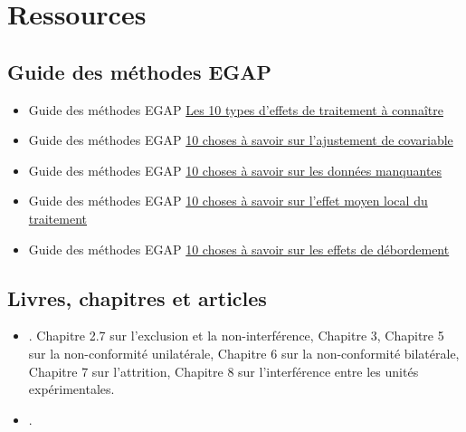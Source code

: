 \documentclass[
  12pt,
]{book}
\begin{document}
\hypertarget{ressources-4}{%
\section{Ressources}\label{ressources-4}}

\hypertarget{guide-des-muxe9thodes-egap-4}{%
\subsection{Guide des méthodes EGAP}\label{guide-des-muxe9thodes-egap-4}}

\begin{itemize}
\item
  Guide des méthodes EGAP \href{https://egap.org/resource/10-types-of-treatment-effect-you-should-know-about/}{Les 10 types d'effets de traitement à connaître}
\item
  Guide des méthodes EGAP \href{https://egap.org/resource/10-things-to-know-about-covariate-adjustment/}{10 choses à savoir sur l'ajustement de covariable}
\item
  Guide des méthodes EGAP \href{https://egap.org/resource/10-things-to-know-about-missing-data/}{10 choses à savoir sur les données manquantes}
\item
  Guide des méthodes EGAP \href{https://egap.org/resource/10-things-to-know-about-the-local-average-treatment-effect/}{10 choses à savoir sur l'effet moyen local du traitement}
\item
  Guide des méthodes EGAP \href{https://egap.org/resource/10-things-to-know-about-spillovers/}{10 choses à savoir sur les effets de débordement}
\end{itemize}

\hypertarget{livres-chapitres-et-articles-3}{%
\subsection{Livres, chapitres et articles}\label{livres-chapitres-et-articles-3}}

\begin{itemize}
\item
  \autocite{gerber_field_2012}. Chapitre 2.7 sur l'exclusion et la non-interférence, Chapitre 3, Chapitre 5 sur la non-conformité unilatérale, Chapitre 6 sur la non-conformité bilatérale, Chapitre 7 sur l'attrition, Chapitre 8 sur l'interférence entre les unités expérimentales.
\item
  \autocite{bowers2020causality}.
\end{itemize}
\end{document}
